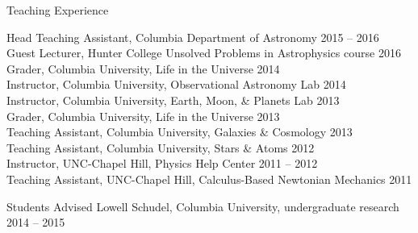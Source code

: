 \documentclass{resume_clark} %
\begin{document}




\begin{rSection}{Teaching Experience}

Head Teaching Assistant, Columbia Department of Astronomy \hfill {2015 -- 2016}\\
Guest Lecturer, Hunter College Unsolved Problems in Astrophysics course \hfill {2016} \\
Grader, Columbia University, Life in the Universe \hfill {2014}\\
Instructor, Columbia University, Observational Astronomy Lab \hfill {2014}\\
Instructor, Columbia University, Earth, Moon, \& Planets Lab \hfill {2013}\\
Grader, Columbia University, Life in the Universe \hfill {2013}\\
Teaching Assistant, Columbia University, Galaxies \& Cosmology \hfill {2013}\\
Teaching Assistant, Columbia University, Stars \& Atoms \hfill {2012}\\
Instructor, UNC-Chapel Hill, Physics Help Center \hfill {2011 -- 2012}\\
Teaching Assistant, UNC-Chapel Hill, Calculus-Based Newtonian Mechanics \hfill {2011}\\

\end{rSection}


\begin{rSection}{Students Advised}
Lowell Schudel, Columbia University, undergraduate research \hfill{2014 -- 2015}\\
\end{rSection}
\end{document}
